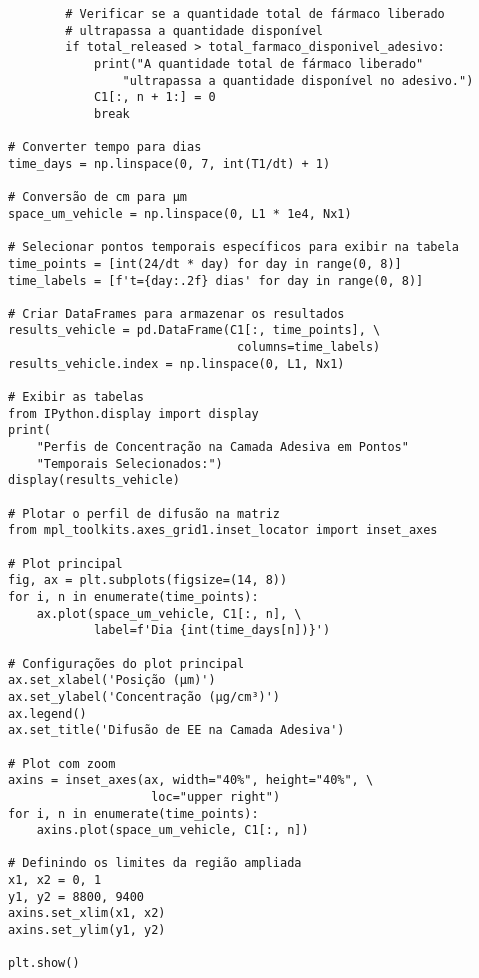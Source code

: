 \begin{verbatim}
        # Verificar se a quantidade total de fármaco liberado 
        # ultrapassa a quantidade disponível
        if total_released > total_farmaco_disponivel_adesivo:
            print("A quantidade total de fármaco liberado" 
                "ultrapassa a quantidade disponível no adesivo.")
            C1[:, n + 1:] = 0
            break

# Converter tempo para dias
time_days = np.linspace(0, 7, int(T1/dt) + 1)

# Conversão de cm para µm
space_um_vehicle = np.linspace(0, L1 * 1e4, Nx1)

# Selecionar pontos temporais específicos para exibir na tabela
time_points = [int(24/dt * day) for day in range(0, 8)]
time_labels = [f't={day:.2f} dias' for day in range(0, 8)]

# Criar DataFrames para armazenar os resultados
results_vehicle = pd.DataFrame(C1[:, time_points], \
                                columns=time_labels)
results_vehicle.index = np.linspace(0, L1, Nx1)

# Exibir as tabelas
from IPython.display import display
print(
    "Perfis de Concentração na Camada Adesiva em Pontos" 
    "Temporais Selecionados:")
display(results_vehicle)

# Plotar o perfil de difusão na matriz
from mpl_toolkits.axes_grid1.inset_locator import inset_axes

# Plot principal
fig, ax = plt.subplots(figsize=(14, 8))
for i, n in enumerate(time_points):
    ax.plot(space_um_vehicle, C1[:, n], \
            label=f'Dia {int(time_days[n])}')

# Configurações do plot principal
ax.set_xlabel('Posição (µm)')
ax.set_ylabel('Concentração (µg/cm³)')
ax.legend()
ax.set_title('Difusão de EE na Camada Adesiva')

# Plot com zoom
axins = inset_axes(ax, width="40%", height="40%", \
                    loc="upper right")
for i, n in enumerate(time_points):
    axins.plot(space_um_vehicle, C1[:, n])

# Definindo os limites da região ampliada
x1, x2 = 0, 1
y1, y2 = 8800, 9400
axins.set_xlim(x1, x2)
axins.set_ylim(y1, y2)

plt.show()
\end{verbatim}

